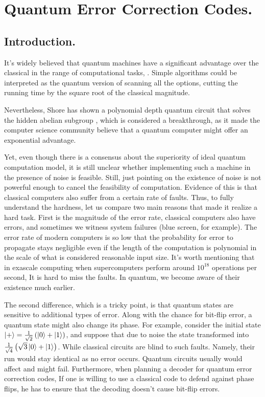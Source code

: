 \chapter{Quantum Error Correction Codes.}
\section{Introduction.}
It's widely believed that quantum machines have a significant advantage over the classical in the range of computational tasks\cite{grover1996fast}, \cite{ahuja1999quantum}. Simple algorithms could be interpreted as the quantum version of scanning all the options, cutting the running time by the square root of the classical magnitude. 

Nevertheless, Shore has shown a polynomial depth quantum circuit that solves the hidden abelian subgroup \cite{Shor_1997}, which is considered a breakthrough, as it made the computer science community believe that a quantum computer might offer an exponential advantage.

Yet, even though there is a consensus about the superiority of ideal quantum computation model, it is still unclear whether implementing such a machine in the presence of noise is feasible.   
Still, just pointing on the existence of noise is not powerful enough to cancel the feasibility of computation. Evidence of this is that classical computers also suffer from a certain rate of faults. Thus, to fully understand the hardness, let us compare two main reasons that made it realize a hard task. 
First is the magnitude of the error rate, classical computers also have errors, and sometimes we witness system failures (blue screen, for example). The error rate of modern computers is so low that the probability for error to propagate stays negligible even if the length of the computation is polynomial in the scale of what is considered reasonable input size. It's worth mentioning that in exascale computing when supercomputers perform around $10^{18}$ operations per second, It is hard to miss the faults. In quantum, we become aware of their existence much earlier.      

The second difference, which is a tricky point, is that quantum states are sensitive to additional types of error. Along with the chance for bit-flip error, a quantum state might also change its phase. For example, consider the initial state $\ket{+} = \frac{1}{\sqrt{2}}\left( \ket{0} + \ket{1} \right)$, and suppose that due to noise the state transformed into $\frac{1}{\sqrt{4}}\left( \sqrt{3}\ket{0} + \ket{1} \right)$. While classical circuits are blind to such faults. Namely, their run would stay identical as no error occurs. Quantum circuits usually would affect and might fail. Furthermore, when planning a decoder for quantum error correction codes, If one is willing to use a classical code to defend against phase flips, he has to ensure that the decoding doesn't cause bit-flip errors. 

